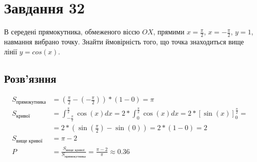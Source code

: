 \documentclass{article}
\begin{document}
\section{Завдання 32}

В середені прямокутника, обмеженого віссю $OX$,
прямими $x = \frac{\pi}{2}$, $x = -\frac{\pi}{2}$, $y = 1$,
навмання вибрано точку. Знайти ймовірність того,
що точка знаходиться вище лінії $y = cos(x)$.

\subsection*{Розв'язння}


\begin{align*}
	S_\text{прямокутника} & = (\frac{\pi}{2} - (-\frac{\pi}{2})) * (1 - 0) = \pi \\
	S_\text{кривої}       & = \int_{-\frac{\pi}{2}}^{\frac{\pi}{2}} \cos(x)dx
	= 2 * \int_{0}^{\frac{\pi}{2}} \cos(x)dx
	= 2 * [\sin(x)]_{0}^{\frac{\pi}{2}} =                                        \\
	                      & = 2 * (\sin(\frac{\pi}{2}) - \sin(0))
	= 2 * (1 - 0) = 2                                                            \\
	S_\text{вище кривої}  & = \pi - 2                                            \\
	P                     & = \frac{S_\text{вище кривої}}{S_\text{прямокутника}}
	= \frac{\pi - 2}{\pi} \approx 0.36
\end{align*}
\end{document}
